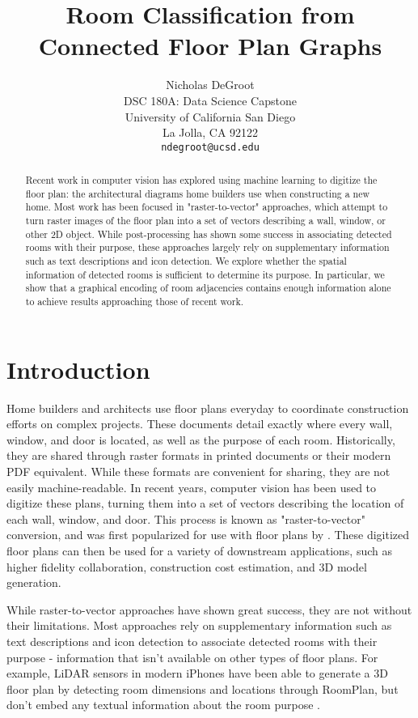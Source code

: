 \documentclass{article}
\title{Room Classification from Connected Floor Plan Graphs}
\author{
Nicholas DeGroot \\
DSC 180A: Data Science Capstone \\
University of California San Diego\\
La Jolla, CA 92122 \\
\texttt{ndegroot@ucsd.edu}
}
\begin{document}
\maketitle

\begin{abstract}

    Recent work in computer vision has explored using machine learning to digitize the floor plan: the architectural diagrams home builders use when constructing a new home. Most work has been focused in "raster-to-vector" approaches, which attempt to turn raster images of the floor plan into a set of vectors describing a wall, window, or other 2D object. While post-processing has shown some success in associating detected rooms with their purpose, these approaches largely rely on supplementary information such as text descriptions and icon detection. We explore whether the spatial information of detected rooms is sufficient to determine its purpose. In particular, we show that a graphical encoding of room adjacencies contains enough information alone to achieve results approaching those of recent work.
    
\end{abstract}

\section{Introduction}

Home builders and architects use floor plans everyday to coordinate construction efforts on complex projects. These documents detail exactly where every wall, window, and door is located, as well as the purpose of each room. Historically, they are shared through raster formats in printed documents or their modern PDF equivalent. While these formats are convenient for sharing, they are not easily machine-readable. In recent years, computer vision has been used to digitize these plans, turning them into a set of vectors describing the location of each wall, window, and door. This process is known as "raster-to-vector" conversion, and was first popularized for use with floor plans by \citet{rastertovec2017}. These digitized floor plans can then be used for a variety of downstream applications, such as higher fidelity collaboration, construction cost estimation, and 3D model generation.

While raster-to-vector approaches have shown great success, they are not without their limitations. Most approaches rely on supplementary information such as text descriptions and icon detection to associate detected rooms with their purpose - information that isn't available on other types of floor plans. For example, LiDAR sensors in modern iPhones have been able to generate a 3D floor plan by detecting room dimensions and locations through RoomPlan, but don't embed any textual information about the room purpose \cite{appleroomplan}.
\end{document}
